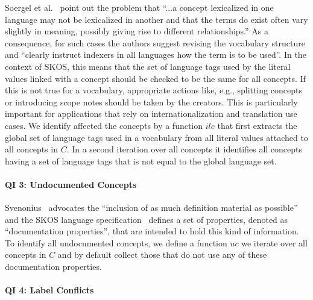 Soergel et al.~\cite{Soergel1997} point out the problem that ``...a concept lexicalized in one language may not be lexicalized in another and that the terms do exist often vary slightly in meaning, possibly giving rise to different relationships.'' As a consequence, for such cases the authors suggest revising the vocabulary structure and ``clearly instruct indexers in all languages how the term is to be used''. In the context of SKOS, this means that the set of language tags used by the literal values linked with a concept should be checked to be the same for all concepts. If this is not true for a vocabulary, appropriate actions like, e.g., splitting concepts or introducing scope notes should be taken by the creators. This is particularly important for applications that rely on internationalization and translation use cases.
We identify affected the concepts by a function $ilc$ that first extracts the global set of language tags used in a vocabulary from all literal values attached to all concepts in $C$. In a second iteration over all concepts it identifies all concepts having a set of language tags that is not equal to the global language set.

\paragraph{QI 3: Undocumented Concepts}

Svenonius~\cite{Svenonius1997} advocates the ``inclusion of as much definition material as possible'' and the SKOS language specification~\cite{SkosReference2008} defines a set of properties, denoted as ``documentation properties'', that are intended to hold this kind of information.
To identify all undocumented concepts, we define a function $uc$ we iterate over all concepts in $C$ and by default collect those that do not use any of these documentation properties.

\paragraph{QI 4: Label Conflicts}

